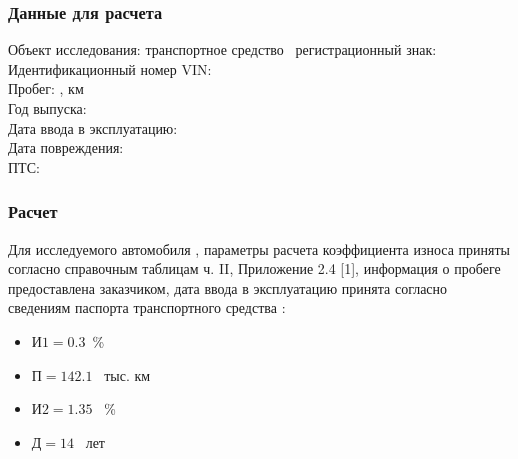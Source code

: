 \subsubsection{Данные для расчета}

\noindent Объект исследования: транспортное средство \tc\,
регистрационный знак: \\ 
Идентификационный номер VIN: \\
Пробег:    , км\\%
Год выпуска:     \\ 
Дата ввода в эксплуатацию:  \\
Дата повреждения:  \\
ПТС: \\
%


\subsubsection{Расчет}

Для исследуемого автомобиля , параметры  расчета коэффициента износа приняты согласно справочным таблицам  ч. II, Приложение 2.4 [1], информация о пробеге предоставлена заказчиком, дата ввода в эксплуатацию принята согласно сведениям паспорта транспортного средства :

\begin{itemize}
	\item [] $ \text{И1} = 0.3$ \,\% %
	\item [] $ \text{П} = 142.1 $ \, тыс. км %
	\item [] $ \text{И2} = 1.35 $ \, \% %
	\item [] $ \text{Д} = 14 $ \, лет %
\end{itemize}

